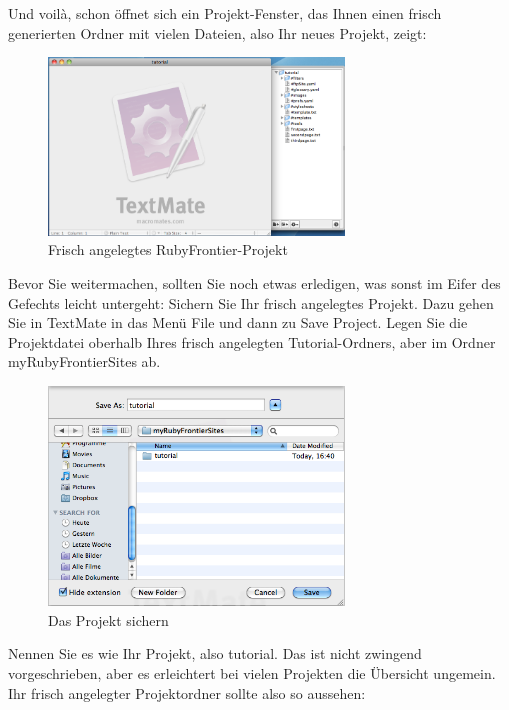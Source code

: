 \documentclass[11pt]{report}
\begin{document}
Und voilà, schon öffnet sich ein Projekt-Fenster, das Ihnen einen
frisch generierten Ordner mit vielen Dateien, also Ihr neues Projekt,
zeigt:

\begin{figure}[h!]
\centering
\includegraphics[width=0.7\textwidth]{./images/neues-projekt.png}
\caption{\label{neues-projekt}Frisch angelegtes RubyFrontier-Projekt}
\end{figure}

Bevor Sie weitermachen, sollten Sie noch etwas erledigen, was sonst im
Eifer des Gefechts leicht untergeht: Sichern Sie Ihr frisch angelegtes
Projekt. Dazu gehen Sie in TextMate in das Menü File und dann zu Save
Project. Legen Sie die Projektdatei oberhalb Ihres frisch angelegten
Tutorial-Ordners, aber im Ordner myRubyFrontierSites ab.

\begin{figure}[h!]
\centering
\includegraphics[width=0.7\textwidth]{./images/projekt-sichern.png}
\caption{\label{projekt-sichern}Das Projekt sichern}
\end{figure}


Nennen Sie es wie Ihr Projekt, also tutorial. Das ist nicht zwingend
vorgeschrieben, aber es erleichtert bei vielen Projekten die Übersicht
ungemein. Ihr frisch angelegter Projektordner sollte also so aussehen:
\end{document}
